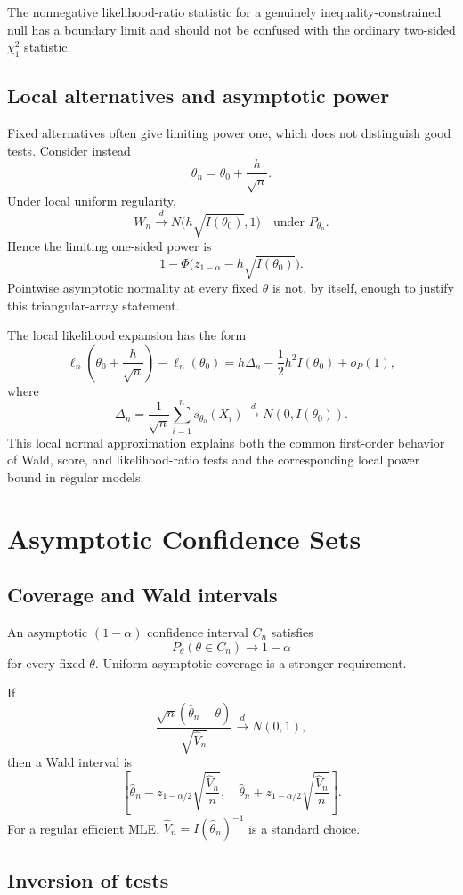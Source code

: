 The nonnegative likelihood-ratio statistic for a genuinely
inequality-constrained null has a boundary limit and should not be
confused with the ordinary two-sided $\chi_1^2$ statistic.

\subsection{Local alternatives and asymptotic power}

Fixed alternatives often give limiting power one, which does not
distinguish good tests. Consider instead
\[
\theta_n=\theta_0+\frac{h}{\sqrt n}.
\]
Under local uniform regularity,
\[
W_n\xrightarrow{d}
N\bigl(h\sqrt{I(\theta_0)},1\bigr)
\quad\text{under }P_{\theta_n}.
\]
Hence the limiting one-sided power is
\[
1-\Phi\bigl(z_{1-\alpha}-h\sqrt{I(\theta_0)}\bigr).
\]
Pointwise asymptotic normality at every fixed $\theta$ is not,
by itself, enough to justify this triangular-array statement.

The local likelihood expansion has the form
\[
\ell_n\left(\theta_0+\frac h{\sqrt n}\right)
-\ell_n(\theta_0)
=
h\Delta_n-\frac12h^2I(\theta_0)+o_P(1),
\]
where
\[
\Delta_n=\frac1{\sqrt n}\sum_{i=1}^ns_{\theta_0}(X_i)
\xrightarrow{d}N(0,I(\theta_0)).
\]
This local normal approximation explains both the common
first-order behavior of Wald, score, and likelihood-ratio tests
and the corresponding local power bound in regular models.

\section{Asymptotic Confidence Sets}

\subsection{Coverage and Wald intervals}

An asymptotic $(1-\alpha)$ confidence interval $C_n$ satisfies
\[
P_\theta(\theta\in C_n)\to1-\alpha
\]
for every fixed $\theta$. Uniform asymptotic coverage is a stronger
requirement.

If
\[
\frac{\sqrt n(\widehat\theta_n-\theta)}
{\sqrt{\widehat V_n}}
\xrightarrow{d}N(0,1),
\]
then a Wald interval is
\[
\left[
\widehat\theta_n-z_{1-\alpha/2}
\sqrt{\frac{\widehat V_n}{n}},
\quad
\widehat\theta_n+z_{1-\alpha/2}
\sqrt{\frac{\widehat V_n}{n}}
\right].
\]
For a regular efficient MLE,
$\widehat V_n=I(\widehat\theta_n)^{-1}$ is a standard choice.

\subsection{Inversion of tests}

